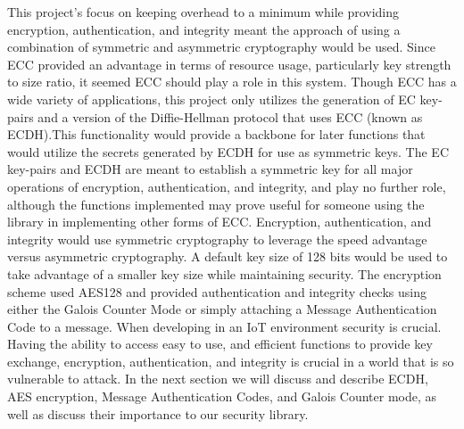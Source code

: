  This project's focus on keeping overhead to a minimum while providing encryption, authentication, and integrity meant the approach of using a combination of symmetric and asymmetric cryptography would be used. Since ECC provided an advantage in terms of resource usage, particularly key strength to size ratio, it seemed ECC should play a role in this system. Though ECC has a wide variety of applications, this project only utilizes the generation of EC key-pairs and a version of the Diffie-Hellman protocol that uses ECC (known as ECDH).This functionality would provide a backbone for later functions that would utilize the secrets generated by ECDH for use as symmetric keys. The EC key-pairs and ECDH are meant to establish a symmetric key for all major operations of encryption, authentication, and integrity, and play no further role, although the functions implemented may prove useful for someone using the library in implementing other forms of ECC. Encryption, authentication, and integrity would use symmetric cryptography to leverage the speed advantage versus asymmetric cryptography. A default key size of 128 bits would be used to take advantage of a smaller key size while maintaining security. The encryption scheme used  AES128 and provided authentication and integrity checks using either the Galois Counter Mode or simply attaching a Message Authentication Code to a message.  When developing in an IoT environment security is crucial. Having the ability to access easy to use, and efficient functions to provide key exchange, encryption, authentication, and integrity is crucial in a world that is so vulnerable to attack. In the next section we will discuss and describe ECDH, AES encryption, Message Authentication Codes, and Galois Counter mode, as well as discuss their importance to our security library.

